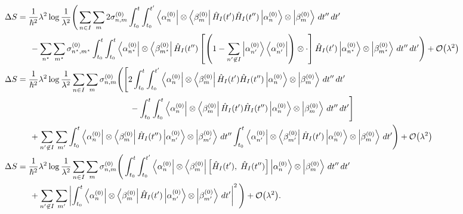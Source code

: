 \documentclass[11pt]{article}
\newcommand{\Od}[1]{\mathcal{O}{\left(#1\right)}}
\newcommand{\bra}[1]{\left\langle#1\right|}
\newcommand{\ket}[1]{\left|#1\right\rangle}
\newcommand{\op}[1]{\hat{#1}}
\theoremstyle{theorem}
\theoremstyle{remark}
\theoremstyle{step}
\theoremstyle{gap}
\begin{document}
\begin{align*}
&\hspace{-4em}\Delta S =\frac{1}{\hbar^2}\lambda^2 \log\frac{1}{\lambda^2} \Bigg(\sum_{n \in I}\sum_m 2 \sigma_{n,m}^{(0)} \int_{t_0}^t \int_{t_0}^{t^\prime} \bra{\alpha_n^{(0)}}\otimes\bra{\beta_m^{(0)}}\op{H}_I (t^\prime) \op{H}_I(t^{\prime\prime}) \ket{\alpha_n^{(0)}}\otimes\ket{\beta_m^{(0)}}\,dt^{\prime\prime}\,dt^\prime \\
&\hspace{-1em}-\sum_{n^\star} \sum_{m^\star} \sigma_{n^\star,m^\star}^{(0)}\int_{t_0}^t \int_{t_0}^{t} \bra{\alpha_{n^\star}^{(0)}}\otimes\bra{\beta_{m^\star}^{(0)}} \op{H}_I (t^{\prime\prime})\left[\left(1-\sum_{n^\prime\not\in I} \ket{\alpha_{n^\prime}^{(0)}}\bra{\alpha_{n^\prime}^{(0)}}\right)\otimes\cdot\right]\op{H}_I (t^\prime) \ket{\alpha_{n^\star}^{(0)}}\otimes\ket{\beta_{m^\star}^{(0)}}\,dt^{\prime\prime}\,dt^\prime \Bigg) + \Od{\lambda^2}\\
&\hspace{-4em}\Delta S =\frac{1}{\hbar^2}\lambda^2 \log\frac{1}{\lambda^2} \sum_{n \in I}\sum_m \sigma_{n,m}^{(0)} \Bigg( \Bigg[2\int_{t_0}^t \int_{t_0}^{t^\prime} \bra{\alpha_n^{(0)}}\otimes\bra{\beta_m^{(0)}}\op{H}_I (t^\prime) \op{H}_I(t^{\prime\prime}) \ket{\alpha_n^{(0)}}\otimes\ket{\beta_m^{(0)}}\,dt^{\prime\prime}\,dt^\prime \\
&\hspace{11em}- \int_{t_0}^t \int_{t_0}^{t} \bra{\alpha_n^{(0)}}\otimes\bra{\beta_m^{(0)}}\op{H}_I (t^\prime) \op{H}_I(t^{\prime\prime}) \ket{\alpha_n^{(0)}}\otimes\ket{\beta_m^{(0)}}\,dt^{\prime\prime}\,dt^\prime\Bigg]\\
&\hspace{-1em}+ \sum_{n^\prime \not\in I} \sum_{m^\prime} \int_{t_0}^t \bra{\alpha_{n}^{(0)}}\otimes\bra{\beta_{m}^{(0)}} \op{H}_I (t^{\prime\prime})\ket{\alpha_{n^\prime}^{(0)}}\otimes\ket{\beta_{m^\prime}^{(0)}} \,dt^{\prime\prime}\int_{t_0}^t \bra{\alpha_{n^\prime}^{(0)}}\otimes\bra{\beta_{m^\prime}^{(0)}} \op{H}_I (t^{\prime})\ket{\alpha_n^{(0)}}\otimes\ket{\beta_m^{(0)}}\,dt^\prime \Bigg) + \Od{\lambda^2}\\
&\hspace{-4em}\Delta S =\frac{1}{\hbar^2}\lambda^2 \log\frac{1}{\lambda^2} \sum_{n \in I}\sum_m \sigma_{n,m}^{(0)} \Bigg( \int_{t_0}^t \int_{t_0}^{t^\prime} \bra{\alpha_n^{(0)}}\otimes\bra{\beta_m^{(0)}}\left[\op{H}_I (t^\prime),\; \op{H}_I(t^{\prime\prime})\right] \ket{\alpha_n^{(0)}}\otimes\ket{\beta_m^{(0)}}\,dt^{\prime\prime}\,dt^\prime \\
&\hspace{-1em}+\sum_{n^\prime \not\in I} \sum_{m^\prime} \left|\int_{t_0}^t \bra{\alpha_{n}^{(0)}}\otimes\bra{\beta_{m}^{(0)}} \op{H}_I (t^{\prime})\ket{\alpha_{n^\prime}^{(0)}}\otimes\ket{\beta_{m^\prime}^{(0)}} \,dt^{\prime}\right|^2 \Bigg) + \Od{\lambda^2}.
\end{align*}
\end{document}
